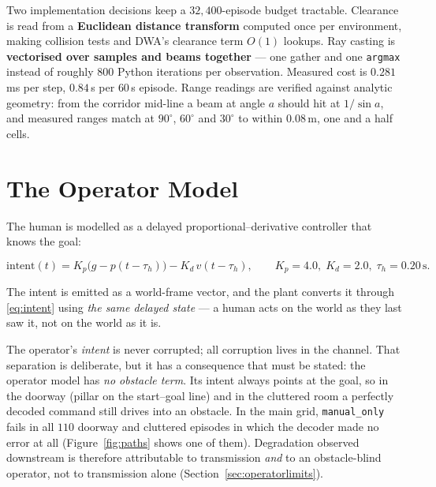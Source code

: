 \documentclass[11pt,a4paper]{article}
\newcommand{\vmanual}{\texttt{manual\_only}}
\theoremstyle{plain}
\theoremstyle{definition}
\begin{document}
Two implementation decisions keep a $32{,}400$-episode budget tractable.
Clearance is read from a \textbf{Euclidean distance transform} computed
once per environment, making collision tests and DWA's clearance term
$O(1)$ lookups. Ray casting is \textbf{vectorised over samples and beams
together} --- one gather and one \texttt{argmax} instead of roughly $800$
Python iterations per observation. Measured cost is $0.281$\,ms per
step, $0.84$\,s per $60$\,s episode. Range readings are verified against
analytic geometry: from the corridor mid-line a beam at angle $a$ should
hit at $1/\sin a$, and measured ranges match at $90^\circ$, $60^\circ$
and $30^\circ$ to within $0.08$\,m, one and a half cells.

\section{The Operator Model}
\label{sec:operator}

The human is modelled as a delayed proportional--derivative controller
that knows the goal:

\begin{equation}
\text{intent}(t) = K_p\bigl(g - p(t-\tau_h)\bigr) - K_d\,v(t-\tau_h),
\qquad K_p = 4.0,\; K_d = 2.0,\; \tau_h = 0.20\,\mathrm{s}.
\label{eq:operator}
\end{equation}

The intent is emitted as a world-frame vector, and the plant converts it
through \eqref{eq:intent} using \emph{the same delayed state} --- a
human acts on the world as they last saw it, not on the world as it is.

The operator's \emph{intent} is never corrupted; all corruption lives in
the channel. That separation is deliberate, but it has a consequence that must be
stated: the operator model has \emph{no obstacle term}. Its intent always
points at the goal, so in the doorway (pillar on the start--goal line)
and in the cluttered room a perfectly decoded command still drives into
an obstacle. In the main grid, \vmanual{} fails in all $110$ doorway and
cluttered episodes in which the decoder made no error at all
(Figure~\ref{fig:paths} shows one of them). Degradation observed
downstream is therefore attributable to transmission \emph{and} to an
obstacle-blind operator, not to transmission alone
(Section~\ref{sec:operatorlimits}).
\end{document}
